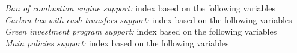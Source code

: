 \documentclass{article}
\begin{document}
\textit{Ban of combustion engine support:} index based on the following variables\\
\textit{Carbon tax with cash transfers support:} index based on the following variables\\
\textit{Green investment program support:} index based on the following variables\\
\textit{Main policies support:} index based on the following variables\\
\end{document}
